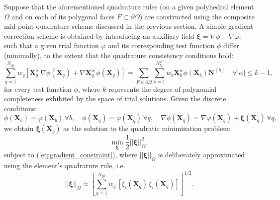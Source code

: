 	Suppose that the aforementioned quadrature rules (on a given polyhedral element $\Omega$ and on each of its polygonal faces $F \subset \partial \Omega$) are constructed using the composite mid-point quadrature scheme discussed in the previous section. A simple gradient correction scheme is obtained by introducing an auxiliary field $\boldsymbol{\xi} = \nabla \phi - \nabla \varphi$, such that a given trial function $\varphi$ and its corresponding test function $\phi$ differ (minimally), to the extent that the quadrature consistency conditions hold:
    \begin{equation}
          \sum_{q=1}^{N_{qp}} w_q \left[ \mathbf{X}_q^{\alpha} \, \nabla \phi (\mathbf{X}_q) + \nabla \mathbf{X}^{\alpha}_{q} \, \phi (\mathbf{X}_q) \right] = \sum_{F \in \partial \Omega} \sum_{b=1}^{N^F_{bp}} w_b \mathbf{X}_b^{\alpha} \phi (\mathbf{X}_b) \mathbf{N}^{(b)} \quad \forall | \alpha | \leq k-1,
          \label{eq:gradient_constraint}
    \end{equation}
    for every test function $\phi$, where $k$ represents the degree of polynomial completeness exhibited by the space of trial solutions. Given the discrete conditions:
    \begin{equation}
		\phi(\mathbf{X}_b) = \varphi(\mathbf{X}_b) \, \forall b, \quad \phi(\mathbf{X}_q) = \varphi(\mathbf{X}_q) \, \forall q, \quad \nabla \phi(\mathbf{X}_q) = \nabla \varphi (\mathbf{X}_q) + \boldsymbol{\xi} (\mathbf{X}_q) \, \forall q,
    	\end{equation}
    	we obtain $\boldsymbol{\xi} (\mathbf{X}_q)$ as the solution to the quadratic minimization problem:
    	\begin{equation}
    		\min_{\boldsymbol{\xi}} \frac{1}{2} || \boldsymbol{\xi} ||^2_{\Omega},
    	\end{equation}
    	subject to (\ref{eq:gradient_constraint}), where $|| \boldsymbol{\xi} ||_{\Omega}$ is deliberately approximated using the element's quadrature rule, i.e.
    	\begin{equation}
    		|| \boldsymbol{\xi} ||_{\Omega} \approx \left[ \sum_{q=1}^{N_{qp}} w_q \, \left[ \xi_i (\mathbf{X}_q) \, \xi_i (\mathbf{X}_q) \right] \right]^{1/2}.
    	\end{equation}
    	

